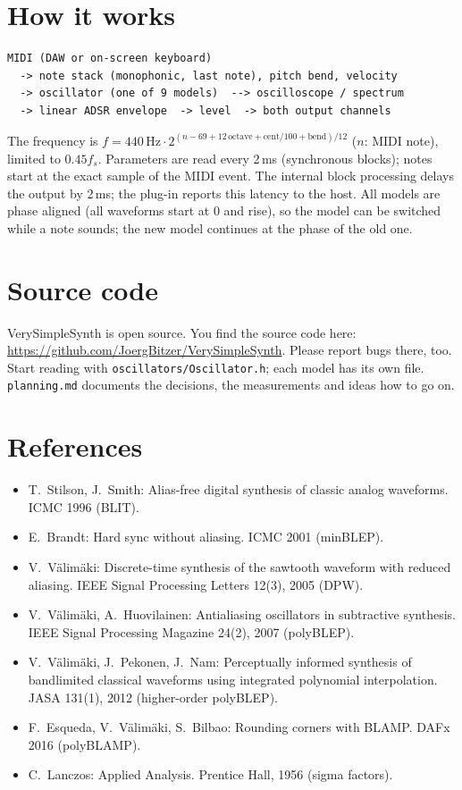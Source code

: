 \documentclass[11pt]{article}
\newcommand{\sourceurl}{https://github.com/JoergBitzer/VerySimpleSynth}
\begin{document}
\section{How it works}
\begin{verbatim}
MIDI (DAW or on-screen keyboard)
  -> note stack (monophonic, last note), pitch bend, velocity
  -> oscillator (one of 9 models)  --> oscilloscope / spectrum
  -> linear ADSR envelope  -> level  -> both output channels
\end{verbatim}
The frequency is $f = 440\,\text{Hz} \cdot 2^{(n - 69 + 12\,\text{octave} + \text{cent}/100 + \text{bend})/12}$
($n$: MIDI note), limited to $0.45 f_s$. Parameters are read every 2\,ms (synchronous blocks); notes
start at the exact sample of the MIDI event. The internal block processing delays the output by 2\,ms;
the plug-in reports this latency to the host. All models are phase aligned (all waveforms start at 0
and rise), so the model can be switched while a note sounds; the new model continues at the phase of
the old one.

\section{Source code}
VerySimpleSynth is open source. You find the source code here:\newline
\url{\sourceurl}. Please report bugs there, too. Start reading with \texttt{oscillators/Oscillator.h};
each model has its own file. \texttt{planning.md} documents the decisions, the measurements and ideas
how to go on.

\section{References}
\begin{itemize}
\item T.~Stilson, J.~Smith: Alias-free digital synthesis of classic analog waveforms. ICMC 1996 (BLIT).
\item E.~Brandt: Hard sync without aliasing. ICMC 2001 (minBLEP).
\item V.~Välimäki: Discrete-time synthesis of the sawtooth waveform with reduced aliasing. IEEE Signal
  Processing Letters 12(3), 2005 (DPW).
\item V.~Välimäki, A.~Huovilainen: Antialiasing oscillators in subtractive synthesis. IEEE Signal
  Processing Magazine 24(2), 2007 (polyBLEP).
\item V.~Välimäki, J.~Pekonen, J.~Nam: Perceptually informed synthesis of bandlimited classical waveforms
  using integrated polynomial interpolation. JASA 131(1), 2012 (higher-order polyBLEP).
\item F.~Esqueda, V.~Välimäki, S.~Bilbao: Rounding corners with BLAMP. DAFx 2016 (polyBLAMP).
\item C.~Lanczos: Applied Analysis. Prentice Hall, 1956 (sigma factors).
\end{itemize}
\end{document}
